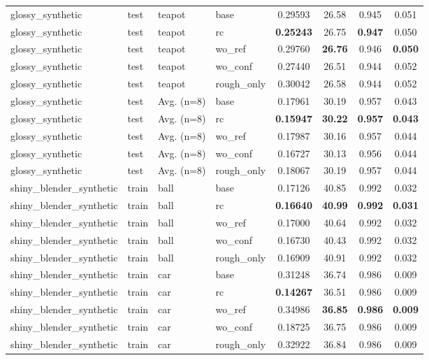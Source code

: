 \begin{table}[t]
{\begin{tabular}{llllcccc}
glossy\_synthetic & test & teapot & base & 0.29593 & 26.58 & 0.945 & 0.051 \\
glossy\_synthetic & test & teapot & rc & \textbf{0.25243} & 26.75 & \textbf{0.947} & 0.050 \\
glossy\_synthetic & test & teapot & wo\_ref & 0.29760 & \textbf{26.76} & 0.946 & \textbf{0.050} \\
glossy\_synthetic & test & teapot & wo\_conf & 0.27440 & 26.51 & 0.944 & 0.052 \\
glossy\_synthetic & test & teapot & rough\_only & 0.30042 & 26.58 & 0.944 & 0.052 \\
glossy\_synthetic & test & Avg. (n=8) & base & 0.17961 & 30.19 & 0.957 & 0.043 \\
glossy\_synthetic & test & Avg. (n=8) & rc & \textbf{0.15947} & \textbf{30.22} & \textbf{0.957} & \textbf{0.043} \\
glossy\_synthetic & test & Avg. (n=8) & wo\_ref & 0.17987 & 30.16 & 0.957 & 0.044 \\
glossy\_synthetic & test & Avg. (n=8) & wo\_conf & 0.16727 & 30.13 & 0.956 & 0.044 \\
glossy\_synthetic & test & Avg. (n=8) & rough\_only & 0.18067 & 30.19 & 0.957 & 0.044 \\
\midrule
shiny\_blender\_synthetic & train & ball & base & 0.17126 & 40.85 & 0.992 & 0.032 \\
shiny\_blender\_synthetic & train & ball & rc & \textbf{0.16640} & \textbf{40.99} & \textbf{0.992} & \textbf{0.031} \\
shiny\_blender\_synthetic & train & ball & wo\_ref & 0.17000 & 40.64 & 0.992 & 0.032 \\
shiny\_blender\_synthetic & train & ball & wo\_conf & 0.16730 & 40.43 & 0.992 & 0.032 \\
shiny\_blender\_synthetic & train & ball & rough\_only & 0.16909 & 40.91 & 0.992 & 0.032 \\
shiny\_blender\_synthetic & train & car & base & 0.31248 & 36.74 & 0.986 & 0.009 \\
shiny\_blender\_synthetic & train & car & rc & \textbf{0.14267} & 36.51 & 0.986 & 0.009 \\
shiny\_blender\_synthetic & train & car & wo\_ref & 0.34986 & \textbf{36.85} & \textbf{0.986} & \textbf{0.009} \\
shiny\_blender\_synthetic & train & car & wo\_conf & 0.18725 & 36.75 & 0.986 & 0.009 \\
shiny\_blender\_synthetic & train & car & rough\_only & 0.32922 & 36.84 & 0.986 & 0.009 \\

\end{tabular}}
\end{table}
